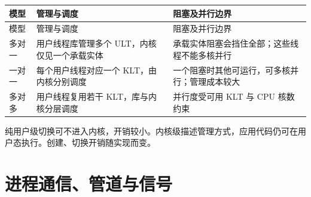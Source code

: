 \par\smallskip
\begin{wideblock}
{\fontsize{9.3}{12}\selectfont\setlength{\tabcolsep}{2.5pt}\setlength{\LTleft}{0pt}\setlength{\LTright}{0pt}
\begin{longtable}{@{}>{\raggedright\arraybackslash}p{}>{\raggedright\arraybackslash}p{}>{\raggedright\arraybackslash}p{}@{}}
\toprule
模型 & 管理与调度 & 阻塞及并行边界 \\

\midrule\endfirsthead\toprule
模型 & 管理与调度 & 阻塞及并行边界 \\

\midrule\endhead\bottomrule\endfoot
多对一 & 用户线程库管理多个 ULT，内核仅见一个承载实体 & 承载实体阻塞会挡住全部；这些线程不能多核并行 \\

一对一 & 每个用户线程对应一个 KLT，由内核分别调度 & 一个阻塞时其他可运行，可多核并行；管理成本较大 \\

多对多 & 用户线程复用若干 KLT，库与内核分层调度 & 并行度受可用 KLT 与 CPU 核数约束 \\

\end{longtable}}
\end{wideblock}
\par\smallskip

纯用户级切换可不进入内核，开销较小。内核级描述管理方式，应用代码仍可在用户态执行。创建、切换开销随实现而变。

\section{进程通信、管道与信号}\label{OS02-ipc}

